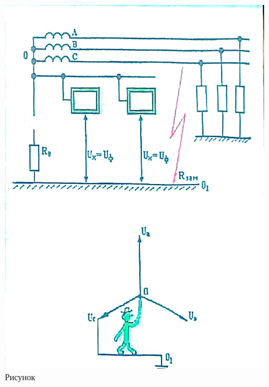 \documentclass[a4paper, 14pt]{extarticle}
\begin{document}
\begin{itemize}
    \begin{figure}[h]
        \centering
        \includegraphics[width=\textwidth]{./img/L5/S003.jpg}
        \caption{Рисунок}
    \end{figure}
    

\end{itemize}
\end{document}

